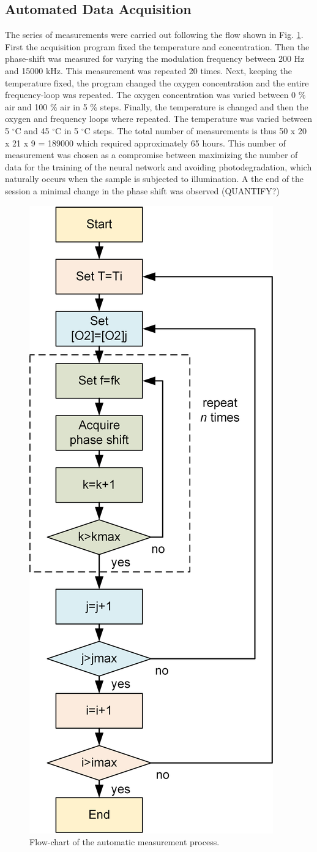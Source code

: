 \documentclass[9pt,twocolumn,twoside,pdftex]{optica}
\begin{document}
\subsection{Automated Data Acquisition}
\label{Data}

The series of measurements were carried out following the flow shown in Fig. \ref{fig:auto-data}. First the acquisition program fixed the temperature and concentration. Then the phase-shift was measured for varying the modulation frequency between 200 Hz and 15000 kHz. This measurement was repeated 20 times. Next, keeping the temperature fixed, the program changed the oxygen concentration and the entire frequency-loop was repeated.
The oxygen concentration was varied between 0 $\%$ air and 100 $\%$ air in 5 $\%$ steps.
Finally, the temperature is changed and then the oxygen and frequency loops where repeated. The temperature was varied between 5 $^\circ$C and 45 $^\circ$C in 5 $^\circ$C steps.
The total number of measurements is thus 50 x 20 x 21 x 9 = 189000 which required approximately 65 hours. This number of measurement was chosen as a compromise between maximizing the number of data for the training of the neural network and avoiding photodegradation, which naturally occurs when the sample is subjected to illumination. A the end of the session a minimal change in the phase shift was observed (QUANTIFY?)

\begin{figure}[t!]
\centering
\includegraphics[keepaspectratio, width=6 cm]{flow-chart.png}
\caption{Flow-chart of the automatic measurement process.}
\label{fig:auto-data}
\end{figure}
\end{document}
